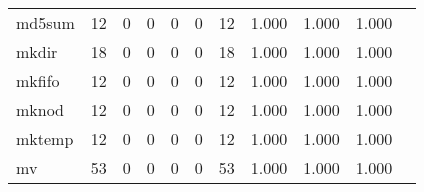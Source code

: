 \begin{longtable}{lp{1.20cm}p{1.20cm}p{1.20cm}p{1.20cm}p{1.20cm}p{1.20cm}p{1.20cm}p{1.20cm}p{1.20cm}p{1.20cm}}
md5sum    &                                    12 &                                                  0 &                                                  0 &                                                  0 &                                                  0 &                                                 12 &                                         1.000 &                                              1.000 &                                              1.000 \\
mkdir     &                                    18 &                                                  0 &                                                  0 &                                                  0 &                                                  0 &                                                 18 &                                         1.000 &                                              1.000 &                                              1.000 \\
mkfifo    &                                    12 &                                                  0 &                                                  0 &                                                  0 &                                                  0 &                                                 12 &                                         1.000 &                                              1.000 &                                              1.000 \\
mknod     &                                    12 &                                                  0 &                                                  0 &                                                  0 &                                                  0 &                                                 12 &                                         1.000 &                                              1.000 &                                              1.000 \\
mktemp    &                                    12 &                                                  0 &                                                  0 &                                                  0 &                                                  0 &                                                 12 &                                         1.000 &                                              1.000 &                                              1.000 \\
mv        &                                    53 &                                                  0 &                                                  0 &                                                  0 &                                                  0 &                                                 53 &                                         1.000 &                                              1.000 &                                              1.000 \\

\end{longtable}
